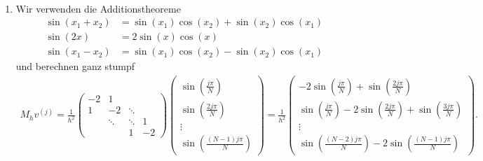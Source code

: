 \begin{solution}
\leavevmode \\
\begin{enumerate}[label = \textbf{\alph*)}]
\item
Wir verwenden die Additionstheoreme
\begin{align}
  \sin(x_1 + x_2) &= \sin(x_1)\cos(x_2) + \sin(x_2)\cos(x_1) \label{add1} \\
  \sin(2x) &= 2\sin(x)\cos(x) \label{add2} \\
  \sin(x_1 - x_2) &= \sin(x_1)\cos(x_2) - \sin(x_2)\cos(x_1) \label{add3}
\end{align}
und berechnen ganz stumpf
\begin{align*}
  M_h v^{(j)} = \frac{1}{h^2}\begin{pmatrix}
    -2 & 1 & &  \\
    1 & -2 & \ddots & \\
    & \ddots & \ddots & 1 \\
    & & 1 & -2
  \end{pmatrix}
  \begin{pmatrix}
  \sin\left(\frac{j\pi}{N}\right) \\
  \sin\left(\frac{2j\pi}{N}\right) \\
  \vdots \\
  \sin\left(\frac{(N-1)j\pi}{N}\right)
  \end{pmatrix}
  = \frac{1}{h^2}\begin{pmatrix}
    -2\sin\left(\frac{j\pi}{N}\right) + \sin\left(\frac{2j\pi}{N}\right) \\
    \sin\left(\frac{j\pi}{N}\right) - 2\sin\left(\frac{2j\pi}{N}\right) + \sin\left(\frac{3j\pi}{N}\right)\\
    \vdots \\
    \sin\left(\frac{(N-2)j\pi}{N}\right) - 2\sin\left(\frac{(N-1)j\pi}{N}\right)
  \end{pmatrix}.
\end{align*}


\end{enumerate}
\end{solution}
